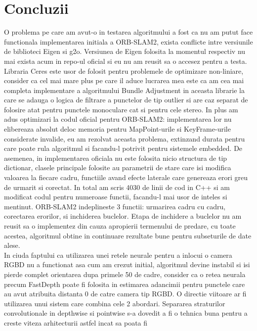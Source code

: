 \documentclass[12pt,a4paper]{report}
\begin{document}
\chapter{Concluzii}
O problema pe care am avut-o in testarea algoritmului a fost ca nu am putut face 
functionala implementarea initiala a ORB-SLAM2, exista conflicte intre versiunile de
biblioteci Eigen si g2o. Versiunea de Eigen folosita la momentul respectiv nu mai 
exista acum in repo-ul oficial si eu nu am reusit sa o accesez pentru a testa.\\ 
Libraria Ceres este usor de folosit pentru problemele de optimizare non-liniare, 
consider ca cel mai mare plus pe care il aduce lucrarea mea este ca am cea mai 
completa implementare a algoritmului Bundle Adjustment in aceasta librarie la 
care se adauga o logica de filtrare a punctelor de tip outlier si are caz 
separat de folosire atat pentru punctele monoculare cat si pentru cele stereo.   
In plus am adus optimizari la codul oficial pentru ORB-SLAM2: implementarea lor 
nu elibereaza absolut deloc memoria pentru MapPoint-urile si KeyFrame-urile 
considerate invalide, eu am rezolvat aceasta problema, extinzand durata pentru 
care poate rula algoritmul si facandu-l potrivit pentru sistemele embedded.
De asemenea, in implementarea oficiala nu este folosita nicio structura de tip
dictionar, clasele principale folosite au parametrii de stare care isi modifica
valoarea la fiecare cadru, functiile avand efecte laterale care genereaza erori 
greu de urmarit si corectat. In total am scris 4030 de linii de cod in C++ si 
am modificat codul pentru numeroase functii, facandu-l mai usor de inteles si 
mentinut. ORB-SLAM2 indeplineste 3 functii: urmarirea cadru cu cadru, corectarea 
erorilor, si inchiderea buclelor. Etapa de inchidere a buclelor nu am reusit sa o 
implementez din cauza apropierii termenului de predare, cu toate acestea, algoritmul
obtine in continuare rezultate bune pentru subseturile de date alese. \\
In ciuda faptului ca utilizarea unei retele neurale pentru a inlocui o camera 
RGBD nu a functionat asa cum am crezut initial, algoritmul devine instabil si 
isi pierde complet orientarea dupa primele 50 de cadre, consider ca o retea 
neurala precum FastDepth poate fi folosita in estimarea adancimii pentru 
punctele care au avut atribuita distanta 0 de catre camera tip RGBD.\@   
O directie viitoare ar fi utilizarea unui sistem care combina cele 2 
abordari. Separarea straturilor convolutionale in depthwise si pointwise s-a dovedit
a fi o tehnica buna pentru a creste viteza arhitecturii astfel incat sa poata fi
\end{document}
